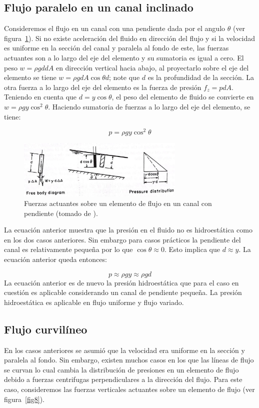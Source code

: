 \documentclass[11pt, oneside]{article}
\begin{document}
\subsection{Flujo paralelo en un canal inclinado}
Consideremos el flujo en un canal con una pendiente dada por el angulo $\theta$ (ver figura~\ref{fig7}). Si no existe aceleraci\'on del fluido en direcci\'on del flujo y si la velocidad es uniforme en la secci\'on del canal y paralela al fondo de este, las fuerzas actuantes son a lo largo del eje del elemento y su sumatoria es igual a cero. El peso  $w=\rho g d dA$ en direcci\'on vertical hacia abajo, al proyectarlo sobre el eje del elemento se tiene $w=\rho g dA \cos \theta d$; note que $d$ es la profundidad de la secci\'on. La otra fuerza a lo largo del eje del elemento es la fuerza de presi\'on $f_z=p dA$. Teniendo en cuenta que $d= y \cos \theta$, el peso del elemento de fluido se convierte en $w = \rho g y \cos^2 \theta$. Haciendo sumatoria de fuerzas a lo largo del eje del elemento, se tiene:

$$
p=\rho g y \cos^2 \theta
$$

\begin{figure}[h]
\centering
\includegraphics[width=8cm]{fig7.jpeg}
\caption{Fuerzas actuantes sobre un elemento de flujo en un canal con pendiente (tomado de \cite{Chau}).}
\label{fig7}
\end{figure}


La ecuaci\'on anterior muestra que la presi\'on en el fluido no es hidroest\'atica como en los dos casos anteriores. Sin embargo para casos pr\'acticos la pendiente del canal es relativamente pequeña por lo que $\cos \theta \approx 0$. Esto implica que $d \approx y$. La ecuaci\'on anterior queda entonces:

$$
p \approx \rho g y \approx \rho g d
$$
La ecuaci\'on anterior es de nuevo la presi\'on hidroest\'atica que para el caso en cuesti\'on es aplicable considerando un canal de pendiente pequeña. La presi\'on hidroest\'atica es aplicable en flujo uniforme y flujo variado.

\subsection{Flujo curvil\'ineo}
En los casos anteriores se asumi\'o que la velocidad era uniforme en la secci\'on y paralela al fondo. Sin embargo, existen muchos casos en los que las l\'ineas de flujo se curvan lo cual cambia la distribuci\'on de presiones en un elemento de flujo debido a fuerzas centrifugas perpendiculares a la direcci\'on del flujo. Para este caso, consideremos las fuerzas verticales actuantes sobre un elemento de flujo (ver figura~\ref{fig8}).
\end{document}
